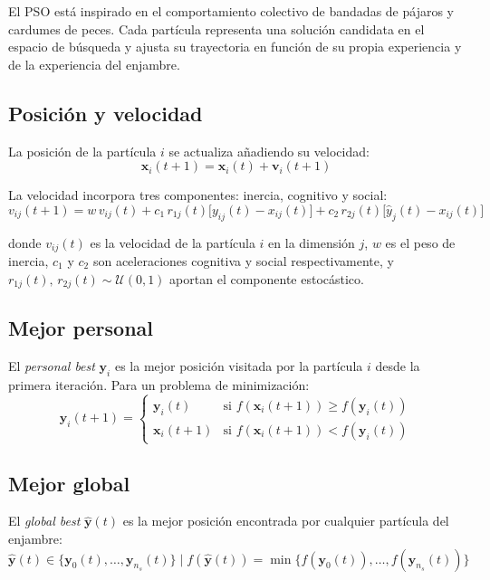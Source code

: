 \documentclass[11pt]{article}
\begin{document}
El PSO est\'a inspirado en el comportamiento colectivo de bandadas de p\'ajaros y cardumes de peces. Cada part\'icula representa una soluci\'on candidata en el espacio de b\'usqueda y ajusta su trayectoria en funci\'on de su propia experiencia y de la experiencia del enjambre.

\subsection{Posici\'on y velocidad}

La posici\'on de la part\'icula $i$ se actualiza a\~nadiendo su velocidad:
\[
\mathbf{x}_i(t+1) = \mathbf{x}_i(t) + \mathbf{v}_i(t+1)
\]

La velocidad incorpora tres componentes: inercia, cognitivo y social:
\[
v_{ij}(t+1) = w\,v_{ij}(t)
  + c_1\,r_{1j}(t)\bigl[y_{ij}(t) - x_{ij}(t)\bigr]
  + c_2\,r_{2j}(t)\bigl[\hat{y}_j(t) - x_{ij}(t)\bigr]
\]

donde $v_{ij}(t)$ es la velocidad de la part\'icula $i$ en la dimensi\'on $j$, $w$ es el peso de inercia, $c_1$ y $c_2$ son aceleraciones cognitiva y social respectivamente, y $r_{1j}(t),\,r_{2j}(t)\sim\mathcal{U}(0,1)$ aportan el componente estoc\'astico.

\subsection{Mejor personal}

El \textit{personal best} $\mathbf{y}_i$ es la mejor posici\'on visitada por la part\'icula $i$ desde la primera iteraci\'on. Para un problema de minimizaci\'on:
\[
\mathbf{y}_i(t+1) =
\begin{cases}
\mathbf{y}_i(t)   & \text{si } f\!\left(\mathbf{x}_i(t+1)\right) \geq f\!\left(\mathbf{y}_i(t)\right) \\
\mathbf{x}_i(t+1) & \text{si } f\!\left(\mathbf{x}_i(t+1)\right) < f\!\left(\mathbf{y}_i(t)\right)
\end{cases}
\]

\subsection{Mejor global}

El \textit{global best} $\hat{\mathbf{y}}(t)$ es la mejor posici\'on encontrada por cualquier part\'icula del enjambre:
\[
\hat{\mathbf{y}}(t) \in \{\mathbf{y}_0(t),\ldots,\mathbf{y}_{n_s}(t)\}
\;\Big|\;
f\!\left(\hat{\mathbf{y}}(t)\right) = \min\bigl\{f\!\left(\mathbf{y}_0(t)\right),\ldots,f\!\left(\mathbf{y}_{n_s}(t)\right)\bigr\}
\]
\end{document}
